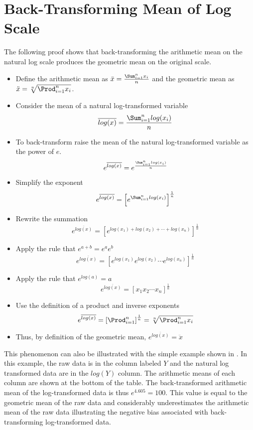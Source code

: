 \section{Back-Transforming Mean of Log Scale} \label{app:ProofBackTransform1}
The following proof shows that back-transforming the arithmetic mean on the natural log scale produces the geometric mean on the original scale.

\begin{itemize}
  \item Define the arithmetic mean as $\bar{x} = \frac{\Sum_{i=1}^{n} x_i}{n}$ and the geometric mean as $\ddot{x} = \sqrt[n]{\Prod_{i=1}^{n} x_i}$.
  \item Consider the mean of a natural log-transformed variable
    \[ \overline{log(x)} = \frac{\Sum_{i=1}^{n} log(x_i)}{n} \]
  \item To back-transform raise the mean of the natural log-transformed variable as the power of $e$.
    \[ e^{\overline{log(x)}} = e^{\frac{\Sum_{i=1}^{n} log(x_i)}{n}} \]
  \item Simplify the exponent
    \[ e^{\overline{log(x)}} = \left[e^{\Sum_{i=1}^{n} log(x_i)}\right]^{\frac{1}{n}} \]
  \item Rewrite the summation
    \[ e^{\overline{log(x)}} = \left[e^{log(x_1)+log(x_2)+ \cdots + log(x_n)}\right]^{\frac{1}{n}} \]
  \item Apply the rule that $e^{a+b}=e^{a}e^{b}$
    \[ e^{\overline{log(x)}} = \left[e^{log(x_1)}e^{log(x_2)} \cdots e^{log(x_n)}\right]^{\frac{1}{n}} \]
  \item Apply the rule that $e^{log(a)}=a$
    \[ e^{\overline{log(x)}} = \left[x_1 x_2 \cdots x_n\right]^{\frac{1}{n}} \]
  \item Use the definition of a product and inverse exponents
    \[ e^{\overline{log(x)}} = \left[\Prod_{i=1}^{n}\right]^{\frac{1}{n}} = \sqrt[n]{\Prod_{i=1}^{n} x_i} \]
  \item Thus, by definition of the geometric mean, $e^{\overline{log(x)}} = \ddot{x}$
\end{itemize}

This phenomenon can also be illustrated with the simple example shown in .  In this example, the raw data is in the column labeled $Y$ and the natural log transformed data are in the $log(Y)$ column.  The arithmetic means of each column are shown at the bottom of the table.  The back-transformed arithmetic mean of the log-transformed data is thus $e^{4.605}=100$.  This value is equal to the geometric mean of the raw data and considerably underestimates the arithmetic mean of the raw data illustrating the negative bias associated with back-transforming log-transformed data.

